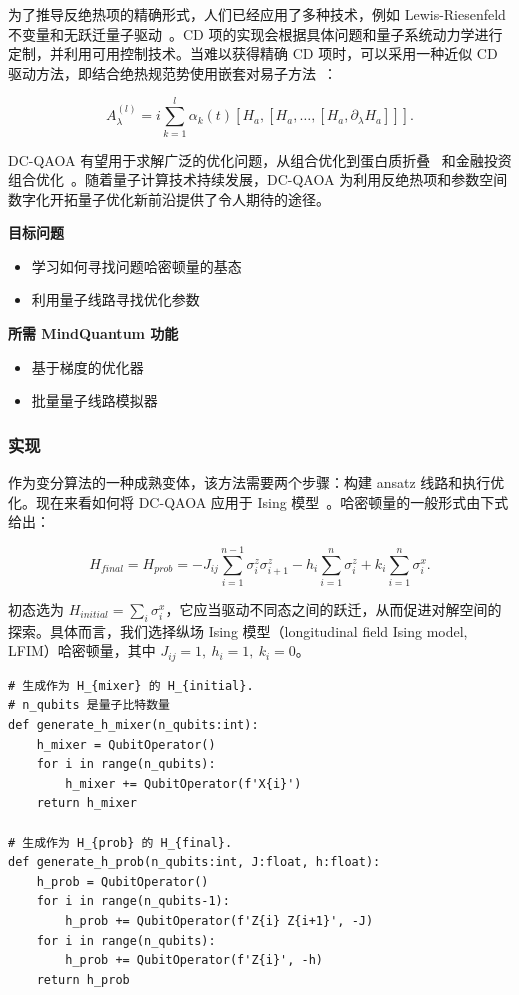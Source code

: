 为了推导反绝热项的精确形式，人们已经应用了多种技术，例如 Lewis-Riesenfeld 不变量和无跃迁量子驱动~\cite{PhysRevA.83.062116}。CD 项的实现会根据具体问题和量子系统动力学进行定制，并利用可用控制技术。当难以获得精确 CD 项时，可以采用一种近似 CD 驱动方法，即结合绝热规范势使用嵌套对易子方法~\cite{PhysRevResearch.4.013141}：

\begin{equation}
    A_{\lambda}^{(l)} = i \sum_{k=1}^{l} \alpha_{k}(t) [H_{a}, [H_{a}, \ldots, [H_{a}, \partial_{\lambda} H_{a}]]].
\end{equation}

DC-QAOA 有望用于求解广泛的优化问题，从组合优化到蛋白质折叠~\cite{PhysRevApplied.20.014024} 和金融投资组合优化~\cite{PhysRevResearch.4.043204}。随着量子计算技术持续发展，DC-QAOA 为利用反绝热项和参数空间数字化开拓量子优化新前沿提供了令人期待的途径。

\textbf{目标问题}
\begin{itemize}
    \item[1.] 学习如何寻找问题哈密顿量的基态
    \item[2.] 利用量子线路寻找优化参数
\end{itemize}
\textbf{所需 MindQuantum 功能}
\begin{itemize}
    \item[1.] 基于梯度的优化器
    \item[2.] 批量量子线路模拟器

\end{itemize}

\subsubsection{实现}
作为变分算法的一种成熟变体，该方法需要两个步骤：构建 ansatz 线路和执行优化。现在来看如何将 DC-QAOA 应用于 Ising 模型~\cite{PhysRevResearch.4.013141}。哈密顿量的一般形式由下式给出：

\begin{equation}
    H_{final} = H_{prob} = -J_{ij}\sum_{i=1}^{n-1}\sigma^z_i\sigma^z_{i+1}-h_{i}\sum_{i=1}^{n}{\sigma_i^z} + k_{i}\sum_{i=1}^{n}\sigma_{i}^{x}.
\end{equation}

初态选为 $H_{initial} = \sum_{i}\sigma_{i}^{x}$，它应当驱动不同态之间的跃迁，从而促进对解空间的探索。具体而言，我们选择纵场 Ising 模型（longitudinal field Ising model, LFIM）哈密顿量，其中 $J_{ij}=1,~h_{i}=1,~k_{i}=0$。
\begin{lstlisting}
# 生成作为 H_{mixer} 的 H_{initial}.
# n_qubits 是量子比特数量
def generate_h_mixer(n_qubits:int):
    h_mixer = QubitOperator()
    for i in range(n_qubits):
        h_mixer += QubitOperator(f'X{i}')
    return h_mixer

# 生成作为 H_{prob} 的 H_{final}.
def generate_h_prob(n_qubits:int, J:float, h:float):
    h_prob = QubitOperator()
    for i in range(n_qubits-1):
        h_prob += QubitOperator(f'Z{i} Z{i+1}', -J)
    for i in range(n_qubits):
        h_prob += QubitOperator(f'Z{i}', -h)
    return h_prob
\end{lstlisting}

